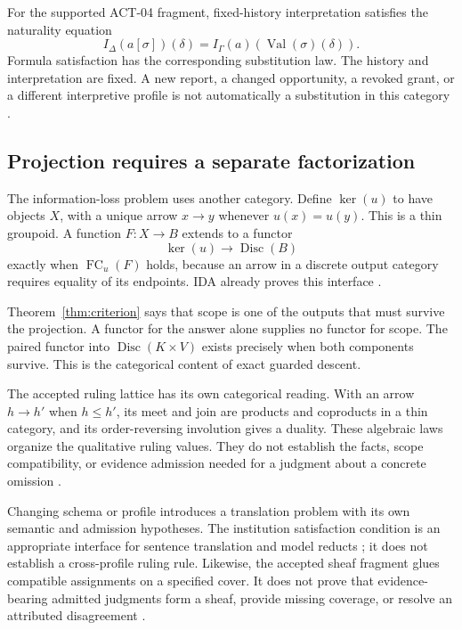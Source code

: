 \documentclass[11pt]{article}
\newcommand{\op}[1]{\operatorname{#1}}
\newcommand{\FC}{\operatorname{FC}}
\begin{document}
For the supported ACT-04 fragment, fixed-history interpretation satisfies the naturality equation
\[
 I_{\Delta}(a[\sigma])(\delta)
 = I_{\Gamma}(a)(\op{Val}(\sigma)(\delta)).
\]
Formula satisfaction has the corresponding substitution law. The history and interpretation are fixed. A new report, a changed opportunity, a revoked grant, or a different interpretive profile is not automatically a substitution in this category \cite{semantics}.

\subsection{Projection requires a separate factorization}

The information-loss problem uses another category. Define \(\ker(u)\) to have objects \(X\), with a unique arrow \(x\to y\) whenever \(u(x)=u(y)\). This is a thin groupoid. A function \(F:X\to B\) extends to a functor
\[
 \ker(u)\longrightarrow\op{Disc}(B)
\]
exactly when \(\FC_u(F)\) holds, because an arrow in a discrete output category requires equality of its endpoints. IDA already proves this interface \cite{factor}.

Theorem~\ref{thm:criterion} says that scope is one of the outputs that must survive the projection. A functor for the answer alone supplies no functor for scope. The paired functor into \(\op{Disc}(K\times V)\) exists precisely when both components survive. This is the categorical content of exact guarded descent.

The accepted ruling lattice has its own categorical reading. With an arrow \(h\to h'\) when \(h\le h'\), its meet and join are products and coproducts in a thin category, and its order-reversing involution gives a duality. These algebraic laws organize the qualitative ruling values. They do not establish the facts, scope compatibility, or evidence admission needed for a judgment about a concrete omission \cite{core,design}.

Changing schema or profile introduces a translation problem with its own semantic and admission hypotheses. The institution satisfaction condition is an appropriate interface for sentence translation and model reducts \cite{institutions}; it does not establish a cross-profile ruling rule. Likewise, the accepted sheaf fragment glues compatible assignments on a specified cover. It does not prove that evidence-bearing admitted judgments form a sheaf, provide missing coverage, or resolve an attributed disagreement \cite{design}.
\end{document}
